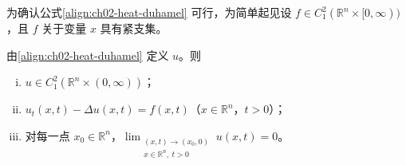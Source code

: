 \documentclass[../../main.tex]{subfiles}
\begin{document}
为确认公式\eqref{align:ch02-heat-duhamel} 可行，为简单起见设 $f\in C^2_1(\mathbb{R}^n\times[0,\infty))$，且 $f$ 关于变量 $x$ 具有紧支集。

\begin{theorem}[非齐次问题的解]\label{theorem:ch02-heat-nonhom}由\eqref{align:ch02-heat-duhamel} 定义 $u$。则
\begin{enumerate}[(i)]
\item $u\in C^2_1(\mathbb{R}^n\times(0,\infty))$；
\item $u_t(x,t)-\Delta u(x,t)=f(x,t)$（$x\in\mathbb{R}^n$，$t>0$）；
\item 对每一点 $x_0\in\mathbb{R}^n$，$\displaystyle\lim_{\substack{(x,t)\to(x_0,0)\\x\in\mathbb{R}^n,\ t>0}}u(x,t)=0$。
\end{enumerate}
\end{theorem}
\end{document}

